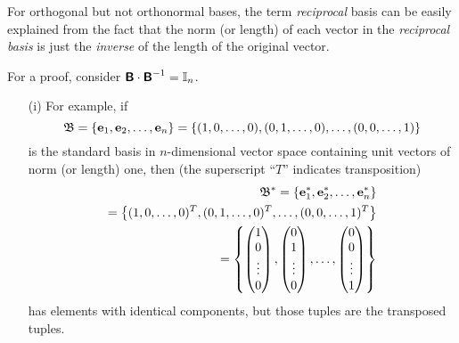 For orthogonal but not orthonormal bases, the term {\em reciprocal} basis
can be easily explained from the fact that the norm (or length) of each vector in the {\em reciprocal basis}
is just the {\em inverse} of the length of the original vector.

{\color{OliveGreen}
\bproof
For a proof, consider $\textsf{\textbf{B}}\cdot \textsf{\textbf{B}}^{-1} ={\Bbb I}_n$.
\eproof
}


{\color{blue}
\bexample
\begin{itemize}
\item[(i)]
For example,
if
$$
{\frak B}=\{{\bf e}_1, {\bf e}_2,\ldots ,{\bf e}_n\}
=
\{
(1,0,\ldots,0),
(0,1,\ldots,0),
\ldots,
(0,0,\ldots,1)
\}
$$
is the standard basis in $n$-dimensional vector space containing unit vectors of norm (or length) one,
then  (the superscript ``$T$'' indicates transposition)
\begin{equation}
\begin{split}
{\frak B}^*
=
\{{\bf e}_1^* ,{\bf e}_2^*, \ldots ,{\bf e}_n^* \}
\\
=
\left\{
(1,0,\ldots,0)^T,
(0,1,\ldots,0)^T,
\ldots,
(0,0,\ldots,1)^T
\right\}
\\
=
\left\{
\begin{pmatrix}
1\\
0\\
\vdots \\
0
\end{pmatrix}
,
\begin{pmatrix}
0\\
1\\
\vdots \\
0
\end{pmatrix}
,
\ldots ,
\begin{pmatrix}
0\\
0\\
\vdots \\
1
\end{pmatrix}
\right
\}
\end{split}
\end{equation}
has elements with identical components,
but those tuples are the transposed tuples.


\end{itemize}}
